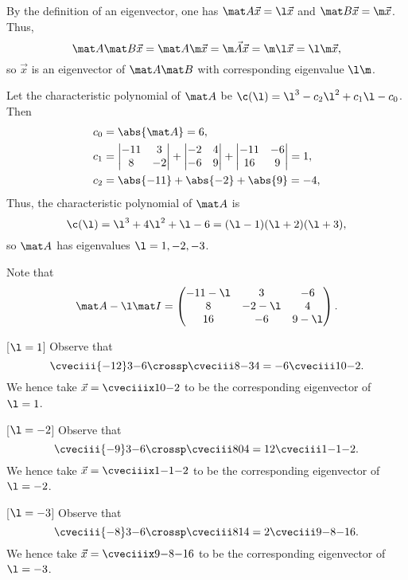 \begin{solution}
    By the definition of an eigenvector, one has $\mat A \vec x = \l \vec x$ and $\mat B \vec x = \m \vec x$. Thus, \[\mat A \mat B \vec x = \mat A \m \vec x = \m \vec A \vec x = \m \l \vec x = \l \m \vec x,\] so $\vec x$ is an eigenvector of $\mat A \mat B$ with corresponding eigenvalue $\l \m$.

    Let the characteristic polynomial of $\mat A$ be $\c(\l) = \l^3 - c_2 \l^2 + c_1 \l - c_0$. Then
    \begin{align*}
        c_0 &= \abs{\mat A} = 6,\\
        c_1 &= \begin{vmatrix}-11 & 3 \\ 8 & -2\end{vmatrix} + \begin{vmatrix}-2 & 4 \\ -6 & 9\end{vmatrix} + \begin{vmatrix}-11 & -6 \\ 16 & 9\end{vmatrix} = 1,\\
        c_2 &= \abs{-11} + \abs{-2} + \abs{9} = -4,
    \end{align*}
    Thus, the characteristic polynomial of $\mat A$ is \[\c(\l) = \l^3 + 4\l^2 + \l - 6 = (\l - 1)(\l + 2)(\l + 3),\] so $\mat A$ has eigenvalues $\l = 1, -2, -3$.

    Note that \[\mat A - \l \mat I = \begin{pmatrix}-11-\l & 3 & -6 \\ 8 & -2-\l & 4 \\ 16 & -6 & 9-\l\end{pmatrix}.\]

    [$\l = 1$] Observe that \[\cveciii{-12}3{-6} \crossp \cveciii8{-3}{4} = -6 \cveciii10{-2}.\] We hence take $\vec x = \cveciiix10{-2}$ to be the corresponding eigenvector of $\l = 1$.

    [$\l = -2$] Observe that \[\cveciii{-9}3{-6} \crossp \cveciii8{0}{4} = 12 \cveciii1{-1}{-2}.\] We hence take $\vec x = \cveciiix1{-1}{-2}$ to be the corresponding eigenvector of $\l = -2$.

    [$\l = -3$] Observe that \[\cveciii{-8}3{-6} \crossp \cveciii8{1}{4} = 2 \cveciii9{-8}{-16}.\] We hence take $\vec x = \cveciiix9{-8}{-16}$ to be the corresponding eigenvector of $\l = -3$.


\end{solution}
